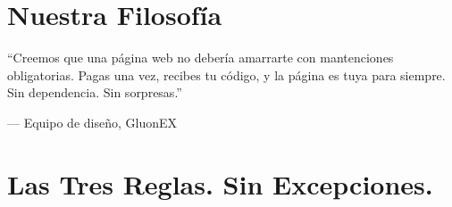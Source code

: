 \documentclass[11pt, a4paper]{article}
\begin{document}
  \vspace{6mm}

  \section*{Nuestra Filosofía}

  \noindent
  \begin{tcolorbox}
    [colback=offwhite, colframe=bordergray, arc=2mm, boxrule=0.5pt, left=6mm,
    right=6mm, top=4mm, bottom=4mm] {\color{darkslate}\small ``Creemos que una página web no debería amarrarte con mantenciones obligatorias. Pagas una vez, recibes tu código, y la página es tuya para siempre. Sin dependencia. Sin sorpresas.''}

    \vspace{2mm}
    \begin{flushright}
      {\color{warmgray}\small — Equipo de diseño, GluonEX}
    \end{flushright}
  \end{tcolorbox}

  \vspace{6mm}

  \section*{Las Tres Reglas. Sin Excepciones.}

  \vspace{2mm}
\end{document}
